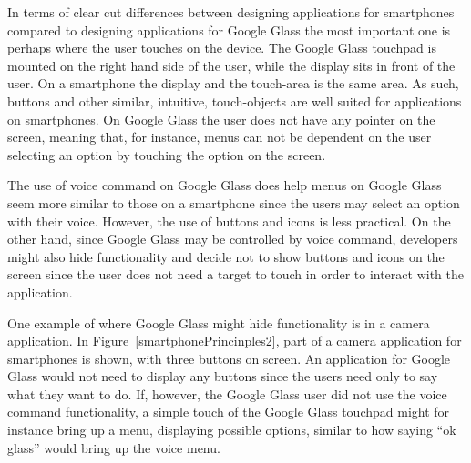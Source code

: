 


In terms of clear cut differences between designing applications for smartphones compared to designing applications for Google Glass the most important one is perhaps where the user touches on the device. The Google Glass touchpad is mounted on the right hand side of the user, while the display sits in front of the user. On a smartphone the display and the touch-area is the same area. As such, buttons and other similar, intuitive, touch-objects are well suited for applications on smartphones. On Google Glass the user does not have any pointer on the screen, meaning that, for instance, menus can not be dependent on the user selecting an option by touching the option on the screen.

The use of voice command on Google Glass does help menus on Google Glass seem more similar to those on a smartphone since the users may select an option with their voice. However, the use of buttons and icons is less practical. On the other hand, since Google Glass may be controlled by voice command, developers might also hide functionality and decide not to show buttons and icons on the screen since the user does not need a target to touch in order to interact with the application.

One example of where Google Glass might hide functionality is in a camera application. In Figure~\ref{smartphonePrincinples2}, part of a camera application for smartphones is shown, with three buttons on screen. An application for Google Glass would not need to display any buttons since the users need only to say what they want to do. If, however, the Google Glass user did not use the voice command functionality, a simple touch of the Google Glass touchpad might for instance bring up a menu, displaying possible options, similar to how saying ``ok glass'' would bring up the voice menu.


